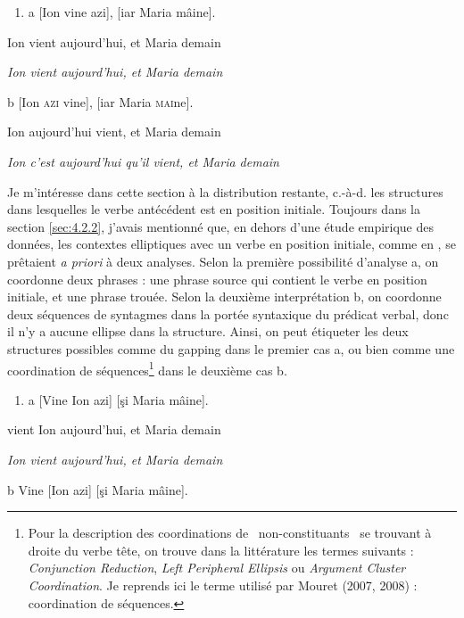 \begin{enumerate}
\item \label{bkm:Ref299721530}a  [Ion vine azi], [iar Maria mâine].


\end{enumerate}
Ion vient aujourd'hui, et Maria demain

{\itshape
Ion vient aujourd'hui, et Maria demain}

  b  [Ion \textsc{azi} vine], [iar Maria \textsc{mai}ne].

    Ion aujourd'hui vient, et Maria demain

{\itshape
Ion c'est aujourd'hui qu'il vient, et Maria demain}

Je m'intéresse dans cette section à la distribution restante, c.-à-d. les structures dans lesquelles le verbe antécédent est en position initiale. Toujours dans la section \ref{sec:4.2.2}, j'avais mentionné que, en dehors d'une étude empirique des données, les contextes elliptiques avec un verbe en position initiale, comme en , se prêtaient \textit{a priori} à deux analyses. Selon la première possibilité d'analyse a, on coordonne deux phrases : une phrase source qui contient le verbe en position initiale, et une phrase trouée. Selon la deuxième interprétation b, on coordonne deux séquences de syntagmes dans la portée syntaxique du prédicat verbal, donc il n'y a aucune ellipse dans la structure. Ainsi, on peut étiqueter les deux structures possibles comme du gapping dans le premier cas a, ou bien comme une coordination de séquences\footnote{Pour la description des coordinations de {\guillemotleft}~non-constituants~{\guillemotright} se trouvant à droite du verbe tête, on trouve dans la littérature les termes suivants : \textit{Conjunction Reduction}, \textit{Left Peripheral Ellipsis} ou \textit{Argument Cluster Coordination}. Je reprends ici le terme utilisé par Mouret (2007, 2008) : coordination de séquences.}  dans le deuxième cas b.


\begin{enumerate}
\item \label{bkm:Ref299721593}a  [Vine Ion azi] [şi Maria mâine].


\end{enumerate}
vient Ion aujourd'hui, et Maria demain

{\itshape
Ion vient aujourd'hui, et Maria demain}

  b  Vine [Ion azi] [şi Maria mâine].

